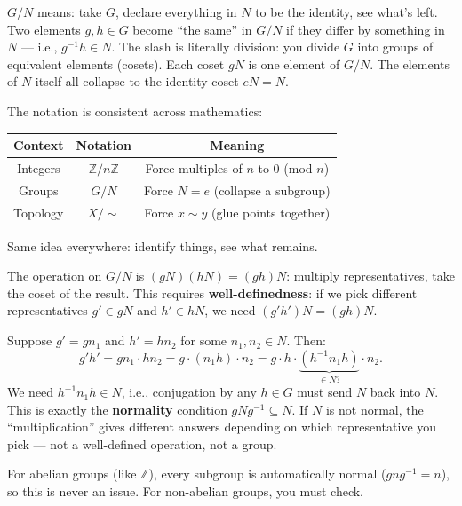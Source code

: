 \documentclass[11pt]{report}
\begin{document}
\begin{rembox}
$G/N$ means: take $G$, declare everything in $N$ to be the identity, see what's left. Two elements $g, h \in G$ become ``the same'' in $G/N$ if they differ by something in $N$ --- i.e., $g^{-1}h \in N$. The slash is literally division: you divide $G$ into groups of equivalent elements (cosets). Each coset $gN$ is one element of $G/N$. The elements of $N$ itself all collapse to the identity coset $eN = N$.

The notation is consistent across mathematics:
\begin{center}
\small
\begin{tabular}{|c|c|c|}
\hline
\textbf{Context} & \textbf{Notation} & \textbf{Meaning} \\
\hline
Integers & $\mathbb{Z}/n\mathbb{Z}$ & Force multiples of $n$ to $0$ (mod $n$) \\
\hline
Groups & $G/N$ & Force $N = e$ (collapse a subgroup) \\
\hline
Topology & $X/{\sim}$ & Force $x \sim y$ (glue points together) \\
\hline
\end{tabular}
\end{center}
Same idea everywhere: identify things, see what remains.
\end{rembox}

\begin{rembox}
The operation on $G/N$ is $(gN)(hN) = (gh)N$: multiply representatives, take the coset of the result. This requires \textbf{well-definedness}: if we pick different representatives $g' \in gN$ and $h' \in hN$, we need $(g'h')N = (gh)N$.

Suppose $g' = gn_1$ and $h' = hn_2$ for some $n_1, n_2 \in N$. Then:
\[g'h' = gn_1 \cdot hn_2 = g \cdot (n_1 h) \cdot n_2 = g \cdot h \cdot \underbrace{(h^{-1} n_1 h)}_{\in N?} \cdot n_2.\]
We need $h^{-1}n_1 h \in N$, i.e., conjugation by any $h \in G$ must send $N$ back into $N$. This is exactly the \textbf{normality} condition $gNg^{-1} \subseteq N$. If $N$ is not normal, the ``multiplication'' gives different answers depending on which representative you pick --- not a well-defined operation, not a group.

For abelian groups (like $\mathbb{Z}$), every subgroup is automatically normal ($gng^{-1} = n$), so this is never an issue. For non-abelian groups, you must check.
\end{rembox}
\end{document}
